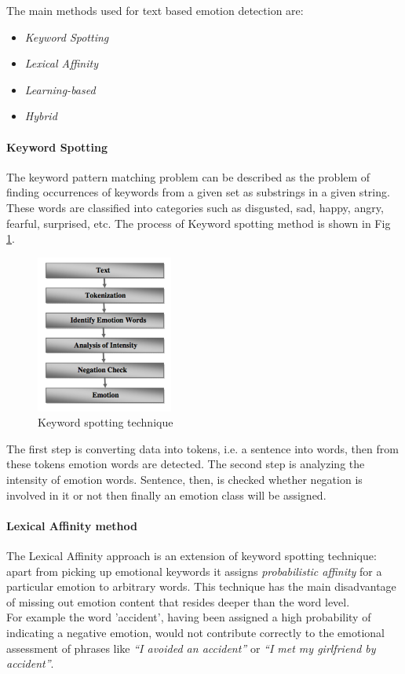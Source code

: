 The main methods used for text based emotion detection are\cite{emodetect-from-text}: 
\begin{itemize}
\item \textit{Keyword Spotting}
\item \textit{Lexical Affinity}
\item \textit{Learning-based}
\item \textit{Hybrid}
\end{itemize}

\paragraph{Keyword Spotting}
The keyword pattern matching problem can be described as the problem of finding occurrences of keywords from a given set as substrings in a given string. These words are classified into categories such as disgusted, sad, happy, angry, fearful, surprised, etc. The process of Keyword spotting method is  shown in Fig \ref{fig:keyword_spotting}. 

\begin{figure}[H]
\centering
\includegraphics[width=0.4\textwidth]{./chapters/chapter1/images/keyword_spotting}
\caption{Keyword spotting technique}
\label{fig:keyword_spotting}
\end{figure}

The first step is converting data into tokens, i.e. a sentence into words, then from these tokens emotion words are detected. The second step is analyzing the intensity of emotion words. Sentence, then, is checked whether negation is involved in it or not then finally an emotion class will be assigned.

\paragraph{Lexical Affinity method} 
The Lexical Affinity approach is an extension of keyword spotting technique: apart from picking up emotional keywords it assigns \textit{probabilistic affinity} for a particular emotion to arbitrary words. This technique has the main disadvantage of missing out emotion content that resides deeper than the word level.\\
For example the word 'accident', having been assigned a high probability of indicating a negative emotion, would not contribute correctly to the emotional assessment of phrases like \textit{``I avoided an accident''} or \textit{``I met my girlfriend by accident''}. 

